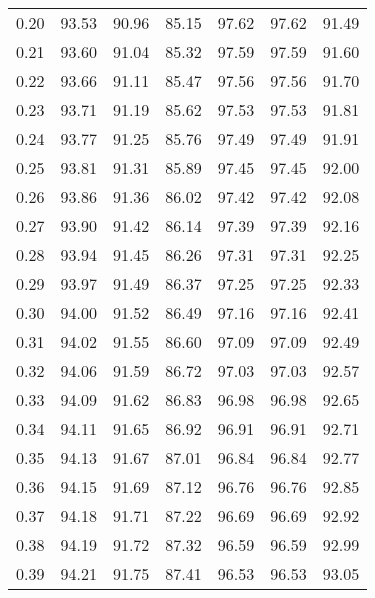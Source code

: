 \begin{tabular}{|c|c|c|c|c|c|c|}
      0.20 &     93.53 &     90.96 &      85.15 &   97.62 &      97.62 &         91.49 \\
      0.21 &     93.60 &     91.04 &      85.32 &   97.59 &      97.59 &         91.60 \\
      0.22 &     93.66 &     91.11 &      85.47 &   97.56 &      97.56 &         91.70 \\
      0.23 &     93.71 &     91.19 &      85.62 &   97.53 &      97.53 &         91.81 \\
      0.24 &     93.77 &     91.25 &      85.76 &   97.49 &      97.49 &         91.91 \\
      0.25 &     93.81 &     91.31 &      85.89 &   97.45 &      97.45 &         92.00 \\
      0.26 &     93.86 &     91.36 &      86.02 &   97.42 &      97.42 &         92.08 \\
      0.27 &     93.90 &     91.42 &      86.14 &   97.39 &      97.39 &         92.16 \\
      0.28 &     93.94 &     91.45 &      86.26 &   97.31 &      97.31 &         92.25 \\
      0.29 &     93.97 &     91.49 &      86.37 &   97.25 &      97.25 &         92.33 \\
      0.30 &     94.00 &     91.52 &      86.49 &   97.16 &      97.16 &         92.41 \\
      0.31 &     94.02 &     91.55 &      86.60 &   97.09 &      97.09 &         92.49 \\
      0.32 &     94.06 &     91.59 &      86.72 &   97.03 &      97.03 &         92.57 \\
      0.33 &     94.09 &     91.62 &      86.83 &   96.98 &      96.98 &         92.65 \\
      0.34 &     94.11 &     91.65 &      86.92 &   96.91 &      96.91 &         92.71 \\
      0.35 &     94.13 &     91.67 &      87.01 &   96.84 &      96.84 &         92.77 \\
      0.36 &     94.15 &     91.69 &      87.12 &   96.76 &      96.76 &         92.85 \\
      0.37 &     94.18 &     91.71 &      87.22 &   96.69 &      96.69 &         92.92 \\
      0.38 &     94.19 &     91.72 &      87.32 &   96.59 &      96.59 &         92.99 \\
      0.39 &     94.21 &     91.75 &      87.41 &   96.53 &      96.53 &         93.05 \\

\end{tabular}
